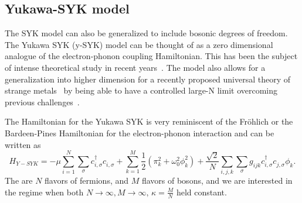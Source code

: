 \subsection{Yukawa-SYK model}
The SYK model can also be generalized to include bosonic degrees of freedom. The Yukawa SYK (y-SYK) model can be thought of as a zero dimensional analogue of the electron-phonon coupling Hamiltonian. This has been the subject of intense theoretical study in recent years~\cite{esterlis2019cooper,wang2020quantum,wang2020solvable,classen2021superconductivity,inkof2022quantum,pan2021yukawa,davis2023quantum,grunwald2024dynamical,choi2022pairing}. The model also allows for a generalization into higher dimension for a recently proposed universal theory of strange metals~\cite{patel2023universal,valentinis2023correlation,esterlis2021large,guo2022large,guo2023large,li2024strange} by being able to have a controlled large-N limit overcoming previous challenges~\cite{lee2009low}.

\par
The Hamiltonian for the Yukawa SYK is very reminiscent of the Fr\"ohlich or the Bardeen-Pines Hamiltonian for the electron-phonon interaction and can be written as 
\begin{equation}
    H_{Y-SYK} = -\mu\sum_{i=1}^N\sum_\sigma c^\dagger_{i,\sigma} c^{\phantom{\dagger}}_{i, \sigma} + \sum_{k=1}^M \frac{1}{2}\left(\pi_k^2 + \omega_0^2\phi_k^2\right) + \frac{\sqrt{2}}{N}\sum_{i,j,k}\sum_{\sigma}g_{ijk} c^\dagger_{i,\sigma} c^{\phantom{\dagger}}_{j,\sigma} \phi^{\phantom{\dagger}}_k .
    \label{eq:HYSYK}
\end{equation}
The are $N$ flavors of fermions, and $M$ flavors of bosons, and we are interested in the regime when both $N\rightarrow\infty, M\rightarrow\infty, \, \kappa = \frac{M}{N}$ held constant. 

